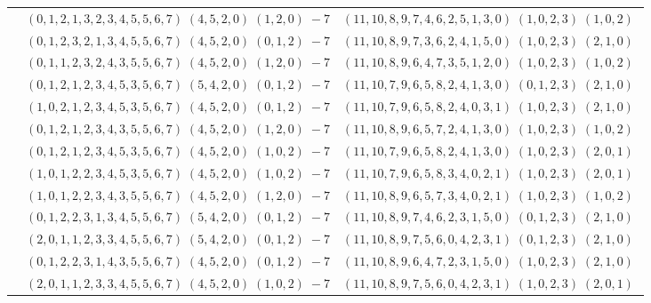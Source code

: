\documentclass[11pt]{article}
\begin{document}
\begin{longtable}[l]{|c|c|c|}
 \cline{2-3} 
 & $(0 ,1 ,2 ,1 ,3 ,2 ,3 ,4 ,5 ,5 ,6 ,7) \;(4 ,5 ,2 ,0) \;(1 ,2 ,0) \;-7$ & $(11 ,10 ,8 ,9 ,7 ,4 ,6 ,2 ,5 ,1 ,3 ,0) \;(1 ,0 ,2 ,3) \;(1 ,0 ,2) \;$\\ 
 \cline{2-3} 
 & $(0 ,1 ,2 ,3 ,2 ,1 ,3 ,4 ,5 ,5 ,6 ,7) \;(4 ,5 ,2 ,0) \;(0 ,1 ,2) \;-7$ & $(11 ,10 ,8 ,9 ,7 ,3 ,6 ,2 ,4 ,1 ,5 ,0) \;(1 ,0 ,2 ,3) \;(2 ,1 ,0) \;$\\ 
 \cline{2-3} 
 & $(0 ,1 ,1 ,2 ,3 ,2 ,4 ,3 ,5 ,5 ,6 ,7) \;(4 ,5 ,2 ,0) \;(1 ,2 ,0) \;-7$ & $(11 ,10 ,8 ,9 ,6 ,4 ,7 ,3 ,5 ,1 ,2 ,0) \;(1 ,0 ,2 ,3) \;(1 ,0 ,2) \;$\\ 
 \cline{2-3} 
 & $(0 ,1 ,2 ,1 ,2 ,3 ,4 ,5 ,3 ,5 ,6 ,7) \;(5 ,4 ,2 ,0) \;(0 ,1 ,2) \;-7$ & $(11 ,10 ,7 ,9 ,6 ,5 ,8 ,2 ,4 ,1 ,3 ,0) \;(0 ,1 ,2 ,3) \;(2 ,1 ,0) \;$\\ 
 \cline{2-3} 
 & $(1 ,0 ,2 ,1 ,2 ,3 ,4 ,5 ,3 ,5 ,6 ,7) \;(4 ,5 ,2 ,0) \;(0 ,1 ,2) \;-7$ & $(11 ,10 ,7 ,9 ,6 ,5 ,8 ,2 ,4 ,0 ,3 ,1) \;(1 ,0 ,2 ,3) \;(2 ,1 ,0) \;$\\ 
 \cline{2-3} 
 & $(0 ,1 ,2 ,1 ,2 ,3 ,4 ,3 ,5 ,5 ,6 ,7) \;(4 ,5 ,2 ,0) \;(1 ,2 ,0) \;-7$ & $(11 ,10 ,8 ,9 ,6 ,5 ,7 ,2 ,4 ,1 ,3 ,0) \;(1 ,0 ,2 ,3) \;(1 ,0 ,2) \;$\\ 
 \cline{2-3} 
 & $(0 ,1 ,2 ,1 ,2 ,3 ,4 ,5 ,3 ,5 ,6 ,7) \;(4 ,5 ,2 ,0) \;(1 ,0 ,2) \;-7$ & $(11 ,10 ,7 ,9 ,6 ,5 ,8 ,2 ,4 ,1 ,3 ,0) \;(1 ,0 ,2 ,3) \;(2 ,0 ,1) \;$\\ 
 \cline{2-3} 
 & $(1 ,0 ,1 ,2 ,2 ,3 ,4 ,5 ,3 ,5 ,6 ,7) \;(4 ,5 ,2 ,0) \;(1 ,0 ,2) \;-7$ & $(11 ,10 ,7 ,9 ,6 ,5 ,8 ,3 ,4 ,0 ,2 ,1) \;(1 ,0 ,2 ,3) \;(2 ,0 ,1) \;$\\ 
 \cline{2-3} 
 & $(1 ,0 ,1 ,2 ,2 ,3 ,4 ,3 ,5 ,5 ,6 ,7) \;(4 ,5 ,2 ,0) \;(1 ,2 ,0) \;-7$ & $(11 ,10 ,8 ,9 ,6 ,5 ,7 ,3 ,4 ,0 ,2 ,1) \;(1 ,0 ,2 ,3) \;(1 ,0 ,2) \;$\\ 
 \cline{2-3} 
 & $(0 ,1 ,2 ,2 ,3 ,1 ,3 ,4 ,5 ,5 ,6 ,7) \;(5 ,4 ,2 ,0) \;(0 ,1 ,2) \;-7$ & $(11 ,10 ,8 ,9 ,7 ,4 ,6 ,2 ,3 ,1 ,5 ,0) \;(0 ,1 ,2 ,3) \;(2 ,1 ,0) \;$\\ 
 \cline{2-3} 
 & $(2 ,0 ,1 ,1 ,2 ,3 ,3 ,4 ,5 ,5 ,6 ,7) \;(5 ,4 ,2 ,0) \;(0 ,1 ,2) \;-7$ & $(11 ,10 ,8 ,9 ,7 ,5 ,6 ,0 ,4 ,2 ,3 ,1) \;(0 ,1 ,2 ,3) \;(2 ,1 ,0) \;$\\ 
 \cline{2-3} 
 & $(0 ,1 ,2 ,2 ,3 ,1 ,4 ,3 ,5 ,5 ,6 ,7) \;(4 ,5 ,2 ,0) \;(0 ,1 ,2) \;-7$ & $(11 ,10 ,8 ,9 ,6 ,4 ,7 ,2 ,3 ,1 ,5 ,0) \;(1 ,0 ,2 ,3) \;(2 ,1 ,0) \;$\\ 
 \cline{2-3} 
 & $(2 ,0 ,1 ,1 ,2 ,3 ,3 ,4 ,5 ,5 ,6 ,7) \;(4 ,5 ,2 ,0) \;(1 ,0 ,2) \;-7$ & $(11 ,10 ,8 ,9 ,7 ,5 ,6 ,0 ,4 ,2 ,3 ,1) \;(1 ,0 ,2 ,3) \;(2 ,0 ,1) \;$\\ 

\end{longtable}
\end{document}
